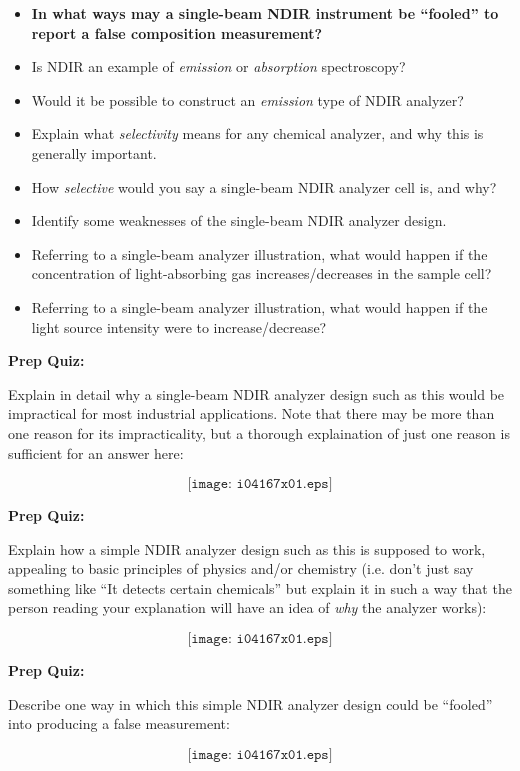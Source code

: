 \begin{itemize}
\item{} {\bf In what ways may a single-beam NDIR instrument be ``fooled'' to report a false composition measurement?}
\item{} Is NDIR an example of {\it emission} or {\it absorption} spectroscopy?
\item{} Would it be possible to construct an {\it emission} type of NDIR analyzer?
\item{} Explain what {\it selectivity} means for any chemical analyzer, and why this is generally important.
\item{} How {\it selective} would you say a single-beam NDIR analyzer cell is, and why?
\item{} Identify some weaknesses of the single-beam NDIR analyzer design.
\item{} Referring to a single-beam analyzer illustration, what would happen if the concentration of light-absorbing gas increases/decreases in the sample cell?
\item{} Referring to a single-beam analyzer illustration, what would happen if the light source intensity were to increase/decrease?
\end{itemize}




\vfil \eject

\noindent
{\bf Prep Quiz:}

Explain in detail why a single-beam NDIR analyzer design such as this would be impractical for most industrial applications.  Note that there may be more than one reason for its impracticality, but a thorough explaination of just one reason is sufficient for an answer here:

$$\texttt{[image: i04167x01.eps]}$$






\vfil \eject

\noindent
{\bf Prep Quiz:}

Explain how a simple NDIR analyzer design such as this is supposed to work, appealing to basic principles of physics and/or chemistry (i.e. don't just say something like ``It detects certain chemicals'' but explain it in such a way that the person reading your explanation will have an idea of {\it why} the analyzer works):

$$\texttt{[image: i04167x01.eps]}$$






\vfil \eject

\noindent
{\bf Prep Quiz:}

Describe one way in which this simple NDIR analyzer design could be ``fooled'' into producing a false measurement:

$$\texttt{[image: i04167x01.eps]}$$









